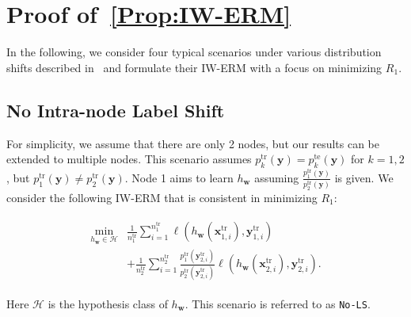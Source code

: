 \section{Proof of~\texorpdfstring{\cref{Prop:IW-ERM}}{reference}\label{app:IWERM}}


In the following, we consider four typical scenarios under various distribution shifts described in~ and formulate their IW-ERM with a focus on minimizing $R_1$.

\subsection{No Intra-node Label Shift} 
\label{No-LS}
For simplicity, we assume that there are only 2 nodes, but our results can be extended to multiple nodes. 
This scenario assumes $p_k^{\text{tr}}(\boldsymbol{y})=p_k^{\text{te}}(\boldsymbol{y})$ for $k=1,2$, but $p_1^{\text{tr}}(\boldsymbol{y}) \neq p_2^{\text{tr}}(\boldsymbol{y})$.
Node 1 aims to learn $h_{\boldsymbol{w}}$ assuming $\frac{p_1^{\text{tr}}(\boldsymbol{y})}{p_2^{\text{tr}}(\boldsymbol{y})}$ is given. We consider the following IW-ERM that is consistent in minimizing $R_1$:

\begin{align}\label{IWERM:nocovar}
\begin{split}
\min_{h_{\boldsymbol{w}} \in \mathcal{H}} &\frac{1}{n_1^{\text{tr}}}\sum_{i=1}^{n_1^{\text{tr}}}\ell(h_{\boldsymbol{w}}(\boldsymbol{x}_{1,i}^{\text{tr}}),\boldsymbol{y}_{1,i}^{\text{tr}}) \\
&+\frac{1}{n_2^{\text{tr}}}\sum_{i=1}^{n_2^{\text{tr}}}\frac{p_1^{\text{tr}}(\boldsymbol{y}_{2,i}^{\text{tr}})}{p_2^{\text{tr}}(\boldsymbol{y}_{2,i}^{\text{tr}})}\ell(h_{\boldsymbol{w}}(\boldsymbol{x}_{2,i}^{\text{tr}}),\boldsymbol{y}_{2,i}^{\text{tr}}).
\end{split}
\end{align}

Here $\mathcal{H}$ is the hypothesis class of $h_{\boldsymbol{w}}$. This scenario is referred to as {\tt No-LS}.

